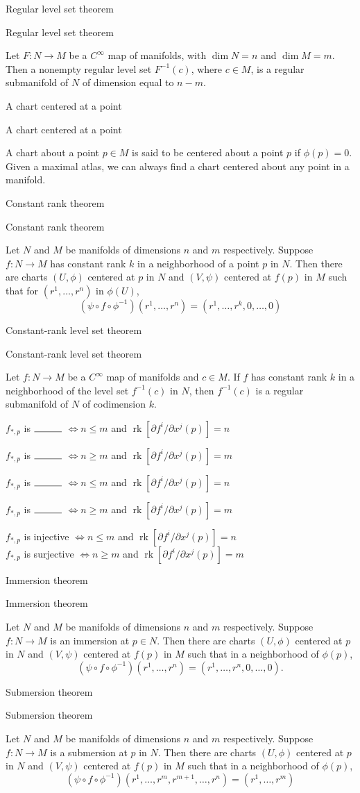\documentclass[17pt]{extarticle}
\newcommand{\boxset}[2]{\begin{mdframed}[style=darkQuesion]
#1
\end{mdframed}
\newpage
\begin{mdframed}[style=darkQuesion]
  #1
    \end{mdframed}
\begin{mdframed}[style=darkAnswer]
  #2
    \end{mdframed}
    \newpage
}
\begin{document}
\boxset{Regular level set theorem}
{Let $F: N \rightarrow M$ be a $C^{\infty}$ map of manifolds, with $\operatorname{dim} N=n$ and $\operatorname{dim} M=m$. Then a nonempty regular level set $F^{-1}(c)$, where $c \in M$, is a regular submanifold of $N$ of dimension equal to $n-m$.}
\boxset{A chart centered at a point}
{A chart about a point $p\in M$ is said to be centered about a point $p$ if $\phi(p)=0$. Given a maximal atlas, we can always find a chart centered about any point in a manifold.}
\boxset{Constant rank theorem}
{Let $N$ and $M$ be manifolds of dimensions $n$ and $m$ respectively. Suppose $f: N \rightarrow M$ has constant rank $k$ in a neighborhood of a point $p$ in $N$. Then there are charts $(U, \phi)$ centered at $p$ in $N$ and $(V, \psi)$ centered at $f(p)$ in $M$ such that for $\left(r^{1}, \ldots, r^{n}\right)$ in $\phi(U)$,
\[\left(\psi \circ f \circ \phi^{-1}\right)\left(r^{1}, \ldots, r^{n}\right)=\left(r^{1}, \ldots, r^{k}, 0, \ldots, 0\right)\]}
\boxset{Constant-rank level set theorem}
{Let $f: N \rightarrow M$ be a $C^{\infty}$ map of manifolds and $c \in M$. If $f$ has constant rank $k$ in a neighborhood of the level set $f^{-1}(c)$ in $N$, then $f^{-1}(c)$ is a regular submanifold of $N$ of codimension $k$.}
\boxset{
$f_{*, p} $ is $\rule{1cm}{0.15mm}$ $ \Longleftrightarrow n \leq m $ and $\operatorname{rk}\left[\partial f^{i} / \partial x^{j}(p)\right]=n$\[\ \]

$f_{*, p} $ is $\rule{1cm}{0.15mm}$ $ \Longleftrightarrow n \geq m $ and $ \operatorname{rk}\left[\partial f^{i} / \partial x^{j}(p)\right]=m $}
{$f_{*, p} $ is injective $ \Longleftrightarrow n \leq m $ and $\operatorname{rk}\left[\partial f^{i} / \partial x^{j}(p)\right]=n$\[\ \]
$f_{*, p} $ is surjective $ \Longleftrightarrow n \geq m $ and $ \operatorname{rk}\left[\partial f^{i} / \partial x^{j}(p)\right]=m $}
\boxset{Immersion theorem}
{Let $N$ and $M$ be manifolds of dimensions $n$ and $m$ respectively. Suppose $f: N \rightarrow M$ is an immersion at $p \in N$. Then there are charts $(U, \phi)$ centered at $p$ in $N$ and $(V, \psi)$ centered at $f(p)$ in $M$ such that in a neighborhood of $\phi(p)$,
\[\left(\psi \circ f \circ \phi^{-1}\right)\left(r^{1}, \ldots, r^{n}\right)=\left(r^{1}, \ldots, r^{n}, 0, \ldots, 0\right) .\]}
\boxset{Submersion theorem}
{Let $N$ and $M$ be manifolds of dimensions $n$ and $m$ respectively. Suppose $f: N \rightarrow M$ is a submersion at $p$ in $N$. Then there are charts $(U, \phi)$ centered at $p$ in $N$ and $(V, \psi)$ centered at $f(p)$ in $M$ such that in a neighborhood of $\phi(p)$,
\[\left(\psi \circ f \circ \phi^{-1}\right)\left(r^{1}, \ldots, r^{m}, r^{m+1}, \ldots, r^{n}\right)=\left(r^{1}, \ldots, r^{m}\right)\]}
\end{document}
